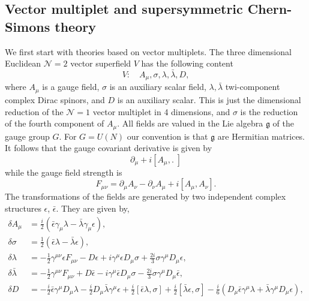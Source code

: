 \subsection{Vector multiplet and supersymmetric Chern-Simons theory}
  We first start with theories based on vector multiplets. The three
  dimensional Euclidean $\mathcal{N}=2$ vector superfield $V$ has the following
  content
  \begin{equation}
    V: \quad A_\mu,\sigma,\lambda,\bar{\lambda}, D,
  \end{equation}
  where $A_\mu$ is a gauge field, $\sigma$ is an auxiliary scalar field,
  $\lambda,\bar{\lambda}$ twi-component complex Dirac spinors, and $D$ is an 
  auxiliary scalar. This is just the dimensional reduction of the
  $\mathcal{N}=1$ vector multiplet in 4 dimensions, and $\sigma$ is the
  reduction of the fourth component of $A_\mu$. All fields are valued in
  the Lie algebra $\mathfrak{g}$ of the gauge group $G$. For $G=U(N)$ our 
  convention is that $\mathfrak{g}$ are Hermitian matrices. It follows
  that the gauge covariant derivative is given by
  \begin{equation}
    \partial_\mu + i\left[A_\mu,.\;\right]
  \end{equation}
  while the gauge field strength is
  \begin{equation}
    F_{\mu\nu} = \partial_\mu A_\nu - \partial_\nu A_\mu
    + i\left[A_\mu,A_\nu\right].
  \end{equation}
The transformations of the fields are generated by two independent complex 
structures $\epsilon$, $\bar{\epsilon}$. They are given by,
\begin{align}
  \delta A_\mu &= \frac{i}{2}(\bar{\epsilon}\gamma_\mu\lambda
  - \bar{\lambda}\gamma_\mu\epsilon),\nonumber\\
  \delta\sigma &= \frac{1}{2}({\bar{\epsilon}}\lambda
  - \bar{{\lambda}}\epsilon),\nonumber\\
  \delta\lambda &= -\frac{1}{2}\gamma^{\mu\nu}\epsilon F_{\mu\nu} - D\epsilon
  + i\gamma^\mu\epsilon D_\mu\sigma + \frac{2i}{3}\sigma\gamma^\mu
  D_\mu\epsilon,\nonumber\\
  \delta\bar{\lambda} &= - \frac{1}{2}\gamma^{\mu\nu}F_{\mu\nu} + D\bar{\epsilon}
  - i\gamma^\mu\bar{\epsilon}D_\mu\sigma
  - \frac{2i}{3}\sigma\gamma^{\mu}D_\mu\bar{\epsilon},\nonumber\\
  \delta D &= -\frac{i}{2}\bar{\epsilon}\gamma^\mu D_\mu\lambda
  - \frac{i}{2}D_\mu\bar{\lambda}\gamma^\mu\epsilon
  + \frac{i}{2}\left[\bar{\epsilon}\lambda,\sigma\right]
  + \frac{i}{2}\left[\bar{\lambda}\epsilon, \sigma\right]
  - \frac{i}{6}(D_\mu\bar{\epsilon}\gamma^\mu\lambda
  + \bar{\lambda}\gamma^{\mu}D_\mu\epsilon),
\end{align}
